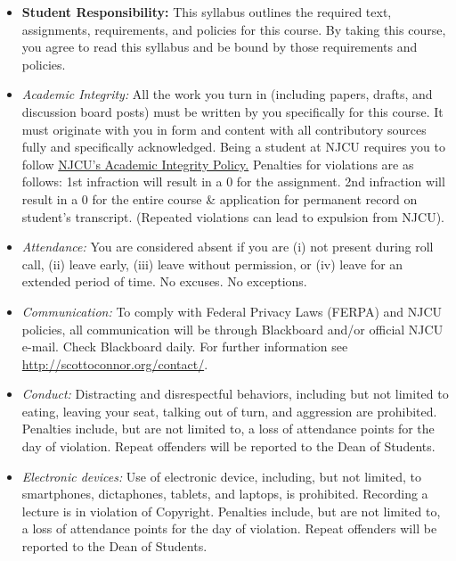 \documentclass[article,oneside]{memoir}
\begin{document}
\begin{itemize}

\item \textbf{Student Responsibility:} This syllabus outlines the required text, assignments, requirements, and policies for this course. By taking this course, you agree to read this syllabus and be bound by those requirements and policies. 

 \item \textit{Academic Integrity:} All the work you turn in (including papers, drafts, and discussion board posts) must be written by you specifically for this course. It must originate with you in form and content with all contributory sources fully and specifically acknowledged. Being a student at NJCU requires you to follow \href{http://scottoconnor.org/resources/Plagiarism.pdf}{NJCU's Academic Integrity Policy.} Penalties for violations are as follows: 1st infraction will result in a 0 for the assignment.  2nd infraction will result in a 0 for the entire course \& application for permanent record on student's transcript. (Repeated violations can lead to expulsion from NJCU). 

\item \textit{Attendance:} You are considered absent if you are (i) not present during roll call, (ii) leave early, (iii) leave without permission, or (iv) leave for an extended period of time. No excuses. No exceptions.

\item \textit{Communication:} To comply with Federal Privacy Laws (FERPA) and NJCU policies, all communication will be through Blackboard and/or official NJCU e-mail. Check Blackboard daily. For further information see \href{http://scottoconnor.org/contact/}{http://scottoconnor.org/contact/}.

\item \textit{Conduct:} Distracting and disrespectful behaviors, including but not limited to eating, leaving your seat, talking out of turn, and aggression are prohibited. Penalties include, but are not limited to, a loss of attendance points for the day of violation. Repeat offenders will be reported to the Dean of Students. 

\item \textit{Electronic devices:} Use of electronic device, including, but not limited, to smartphones, dictaphones, tablets, and laptops, is prohibited. Recording a lecture is in violation of Copyright. Penalties include, but are not limited to, a loss of attendance points for the day of violation. Repeat offenders will be reported to the Dean of Students.


\end{itemize}
\end{document}

